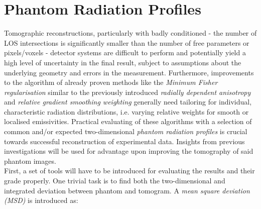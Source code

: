    \section{Phantom Radiation Profiles}\label{sec:phantoms}%
%
        Tomographic reconstructions, particularly with badly conditioned - the number of LOS intersections is significantly smaller than the number of free parameters or pixels/voxels - detector systems are difficult to perform and potentially yield a high level of uncertainty in the final result, subject to assumptions about the underlying geometry and errors in the measurement. Furthermore, improvements to the algorithm of already proven methods like the \textit{Minimum Fisher regularisation} similar to the previously introduced \textit{radially dependent anisotropy} and \textit{relative gradient smoothing weighting} generally need tailoring for individual, characteristic radiation distributions, i.e. varying relative weights for smooth or localised emissivities. Practical evaluating of these algorithms with a selection of common and/or expected two-dimensional \textit{phantom radiation profiles} is crucial towards successful reconstruction of experimental data. Insights from previous investigations will be used for advantage upon improving the tomography of said phantom images.\\%
        First, a set of tools will have to be introduced for evaluating the results and their grade properly. One trivial task is to find both the two-dimensional and integrated deviation between phantom and tomogram. A \textit{mean square deviation (MSD)} is introduced as:%

